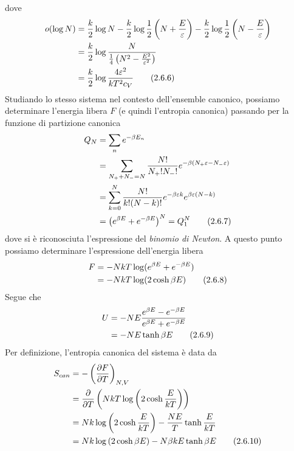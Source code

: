 \documentclass{article}
\begin{document}
dove 
\begin{align}
    o(\log N) &= \frac{k}{2}\log N - \frac{k}{2}\log\frac{1}{2}\left(N + \frac{E}{\varepsilon}\right) - \frac{k}{2}\log\frac{1}{2}\left(N - \frac{E}{\varepsilon}\right) \notag \\
    &= \frac{k}{2}\log\frac{N}{\frac{1}{4}\left(N^2 - \frac{E^2}{\varepsilon^2}\right)} \notag \\
    &= \frac{k}{2}\log\frac{4\varepsilon^2}{kT^2c_V} \tag{2.6.6}
\end{align}
Studiando lo stesso sistema nel contesto dell'ensemble canonico, possiamo determinare l'energia libera $F$ (e quindi l'entropia canonica) passando per la funzione di partizione canonica
\begin{align}
    Q_N &= \sum_n e^{-\beta E_n} \notag \\
    &= \sum_{N_+ + N_- = N}\frac{N!}{N_+!N_-!}e^{-\beta(N_+\varepsilon - N_-\varepsilon)} \notag \\
    &= \sum_{k = 0}^N\frac{N!}{k!(N - k)!}e^{-\beta\varepsilon k}e^{\beta\varepsilon(N - k)} \notag \\
    &= \left(e^{\beta E} + e^{-\beta E}\right)^N = Q^N_1 \tag{2.6.7}
\end{align}
dove si è riconosciuta l'espressione del \textit{binomio di Newton}. A questo punto possiamo determinare l'espressione dell'energia libera 
\begin{align}
    F &= -NkT\log(e^{\beta E} + e^{-\beta E}) \notag \\
    &= -NkT\log(2\cosh \beta E) \tag{2.6.8}
\end{align}
Segue che 
\begin{align}
    U &= -NE\frac{e^{\beta E} - e^{-\beta E}}{e^{\beta E} + e^{-\beta E}} \notag \\
    &= -NE\tanh \beta E \tag{2.6.9}
\end{align}
Per definizione, l'entropia canonica del sistema è data da
\begin{align}
    S_{can} &= -\left(\frac{\partial F}{\partial T}\right)_{N, V} \notag \\
    &= \frac{\partial}{\partial T}\left(NkT\log\left(2\cosh \frac{E}{kT}\right)\right) \notag \\
    &= Nk\log\left(2\cosh \frac{E}{kT}\right) - \frac{NE}{T}\tanh\frac{E}{kT} \notag \\
    &= Nk\log\left(2\cosh \beta E\right) - N\beta kE\tanh \beta E \tag{2.6.10}
\end{align}

\newpage
\end{document}
